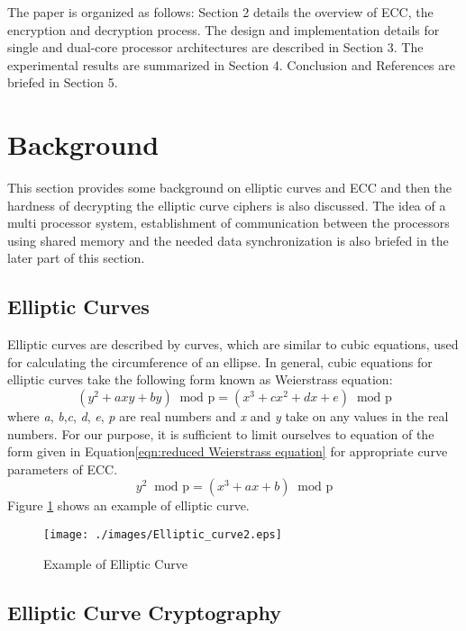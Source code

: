 \documentclass[preprint,12pt]{elsarticle}
\begin{document}
The paper is organized as follows: Section 2 details the overview of ECC, the encryption and decryption process. The design and implementation details for single and dual-core processor architectures are described in Section 3. The experimental results are summarized in Section 4. Conclusion and References are briefed in Section 5.



\section{Background}                                                                            
This section provides some background on elliptic curves and ECC and then the hardness of decrypting the elliptic curve ciphers is also discussed. The idea of a multi processor system, establishment of communication between the processors using shared memory and the needed data synchronization is also briefed in the later part of this section.
\subsection{Elliptic Curves}
Elliptic curves are described by curves, which are similar to cubic equations, used for calculating the circumference of an ellipse. In general, cubic equations for elliptic curves take the following form known as Weierstrass equation\cite{stalling}:
\begin{equation}
(y^2 + axy + by)  \;\;\text{mod p} = (x^3 + cx^2 + dx + e) \;\;\text{mod p}
\label{eqn:Weierstrass equation}
\end{equation}
where \emph{a}, \emph{b},\emph{c}, \emph{d}, \emph{e}, \emph{p} are real numbers and \emph{x} and \emph{y} take on any values in the real numbers. For our purpose, it is sufficient to limit ourselves to equation of the form given in Equation\ref{eqn:reduced Weierstrass equation} for appropriate curve parameters of ECC.
\begin{equation}
y^2 \;\;\text{mod p} = (x^3 + ax + b)\;\; \text{mod p}
\label{eqn:reduced Weierstrass equation}
\end{equation}
 Figure \ref{fig:elliptic curve(a)} shows an example of elliptic curve.
\begin{figure}[htbp]
	\centering
		\texttt{[image: ./images/Elliptic\_curve2.eps]}
\caption[elliptic curve(a)]{Example of Elliptic Curve}
	\label{fig:elliptic curve(a)}
\end{figure}
 
\subsection{Elliptic Curve Cryptography}
\end{document}
